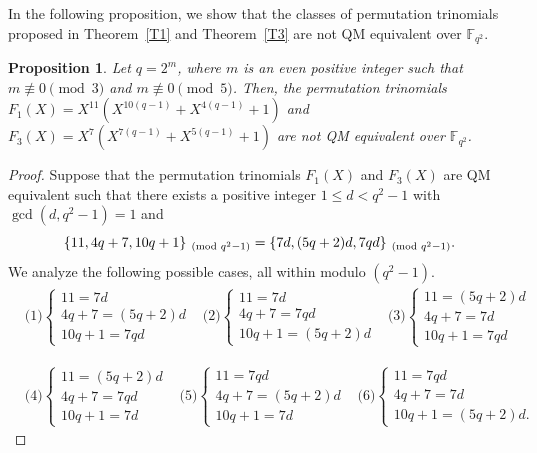 \documentclass[12pt,reqno]{amsart}
\newtheorem{prop}[thm]{Proposition}
\numberwithin{equation}{section}
\theoremstyle{definition}
\newcommand{\F}{\mathbb F}
\begin{document}
In the following proposition, we show that the classes of permutation trinomials proposed in Theorem~\ref{T1} and Theorem~\ref{T3} are not QM equivalent over $\F_{q^2}$.
\begin{prop}{\label{prop1}}
Let $q=2^m$, where $m$ is an even positive integer such that $m\not\equiv0\pmod{3}$ and $m\not\equiv0\pmod{5}$. Then, the permutation trinomials $F_1(X)=X^{11}(X^{10(q-1)} + X^{4(q-1)} + 1)$ and $F_3(X)=X^{7}( X^{7(q-1)} + X^{5(q-1)} + 1)$ are not QM equivalent over $\F_{q^2}$.
\end{prop}
\begin{proof}
Suppose that the permutation trinomials $F_1(X)$ and $F_3(X)$ are QM equivalent such that there exists a positive integer $1 \leq d < q^2-1$ with $\gcd(d,q^2-1)=1$ and   
\begin{equation}{\label{1eq}}
\{11,4q+7,10q+1\}_{\pmod{q^2-1}}=\{7d,(5q+2)d,7qd\}_{\pmod{q^2-1}}.
\end{equation}
We analyze the following possible cases, all within modulo $(q^2 - 1)$.
    \begin{align*}
        & \text{(1)} \begin{cases}
			11=7d\\
			4q+7=(5q+2)d\\
			10q+1=7qd
		\end{cases} 
        & \text{(2)}  \begin{cases}
			11=7d\\
			4q+7=7qd\\
                10q+1=(5q+2)d
		\end{cases} 
        & \text{(3)}  \begin{cases}
			11=(5q+2)d\\
			4q+7=7d\\
			10q+1=7qd
		\end{cases} 
        \end{align*}
        
\begin{align*}
 & \text{(4)} \begin{cases}
		11=(5q+2)d\\
		4q+7=7qd\\
		10q+1=7d
\end{cases}  
& \text{(5)} \begin{cases}
		11=7qd\\
		4q+7=(5q+2)d\\
		10q+1=7d
\end{cases} 
        &\text{(6)} \begin{cases}
			11=7qd\\
			4q+7=7d\\
			10q+1=(5q+2)d.
		\end{cases}
    \end{align*}
    

\end{proof}
\end{document}
